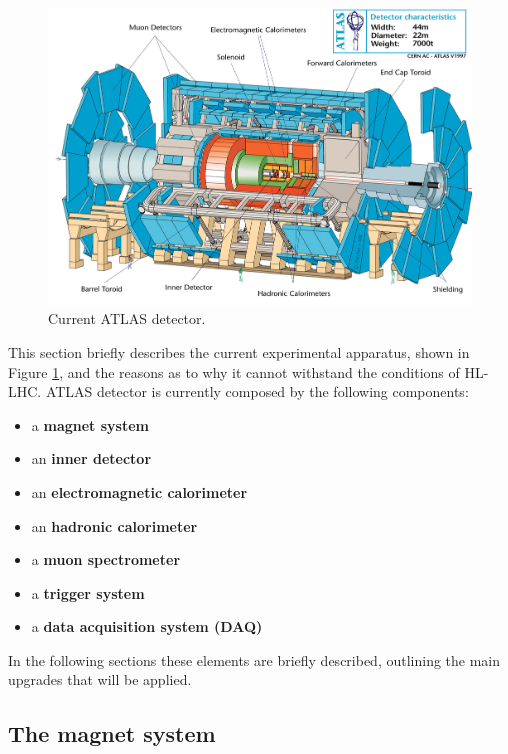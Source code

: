 \documentclass[a4paper,12pt]{article}
\begin{document}
\begin{figure} [h]
	\includegraphics[width=\textwidth]{atlasdet}
	\caption{Current ATLAS detector.}
	\label{fig:current_atlasdet}
\end{figure}

This section briefly describes the current experimental apparatus, shown in Figure \ref{fig:current_atlasdet}, and the reasons as to why it cannot withstand the conditions of HL-LHC.
\smallskip
ATLAS detector is currently composed by the following components:
\begin{itemize}
\item a \textbf{magnet system}
\item an \textbf{inner detector}
\item an \textbf{electromagnetic calorimeter}
\item an \textbf{hadronic calorimeter}
\item a \textbf{muon spectrometer}
\item a \textbf{trigger system}
\item a \textbf{data acquisition system (DAQ)}
\end{itemize}

In the following sections these elements are briefly described, outlining the main upgrades that will be applied. 

\subsection{The magnet system}\label{sec:magnet}
\end{document}
